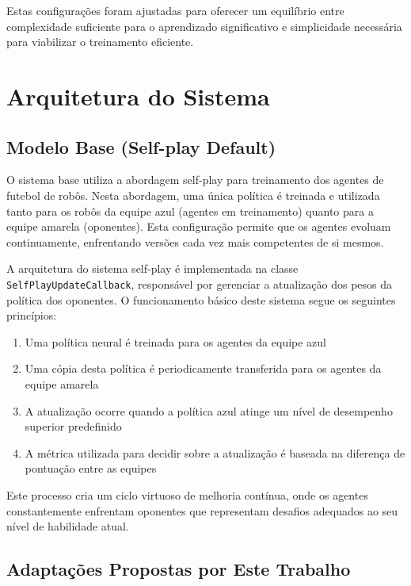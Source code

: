 Estas configurações foram ajustadas para oferecer um equilíbrio entre complexidade suficiente para o aprendizado significativo e simplicidade necessária para viabilizar o treinamento eficiente.

\section{Arquitetura do Sistema}
\label{sec:arquitetura_sistema}

\subsection{Modelo Base (Self-play Default)}

O sistema base utiliza a abordagem self-play para treinamento dos agentes de futebol de robôs. Nesta abordagem, uma única política é treinada e utilizada tanto para os robôs da equipe azul (agentes em treinamento) quanto para a equipe amarela (oponentes). Esta configuração permite que os agentes evoluam continuamente, enfrentando versões cada vez mais competentes de si mesmos.

A arquitetura do sistema self-play é implementada na classe \texttt{SelfPlayUpdateCallback}, responsável por gerenciar a atualização dos pesos da política dos oponentes. O funcionamento básico deste sistema segue os seguintes princípios:

\begin{enumerate}
    \item Uma política neural é treinada para os agentes da equipe azul
    \item Uma cópia desta política é periodicamente transferida para os agentes da equipe amarela
    \item A atualização ocorre quando a política azul atinge um nível de desempenho superior predefinido
    \item A métrica utilizada para decidir sobre a atualização é baseada na diferença de pontuação entre as equipes
\end{enumerate}

Este processo cria um ciclo virtuoso de melhoria contínua, onde os agentes constantemente enfrentam oponentes que representam desafios adequados ao seu nível de habilidade atual.

\subsection{Adaptações Propostas por Este Trabalho}

